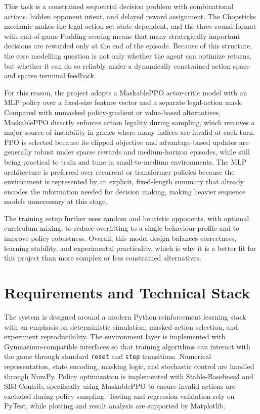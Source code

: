 \documentclass[10pt]{article}
\begin{document}
This task is a constrained sequential decision problem with combinational actions, hidden opponent intent, and delayed reward assignment. The Chopsticks mechanic makes the legal action set state-dependent, and the three-round format with end-of-game Pudding scoring means that many strategically important decisions are rewarded only at the end of the episode. Because of this structure, the core modelling question is not only whether the agent can optimize returns, but whether it can do so reliably under a dynamically constrained action space and sparse terminal feedback.

For this reason, the project adopts a MaskablePPO actor-critic model with an MLP policy over a fixed-size feature vector and a separate legal-action mask. Compared with unmasked policy-gradient or value-based alternatives, MaskablePPO directly enforces action legality during sampling, which removes a major source of instability in games where many indices are invalid at each turn. PPO is selected because its clipped objective and advantage-based updates are generally robust under sparse rewards and medium-horizon episodes, while still being practical to train and tune in small-to-medium environments. The MLP architecture is preferred over recurrent or transformer policies because the environment is represented by an explicit, fixed-length summary that already encodes the information needed for decision making, making heavier sequence models unnecessary at this stage.

The training setup further uses random and heuristic opponents, with optional curriculum mixing, to reduce overfitting to a single behaviour profile and to improve policy robustness. Overall, this model design balances correctness, learning stability, and experimental practicality, which is why it is a better fit for this project than more complex or less constrained alternatives.

\section{Requirements and Technical Stack}

The system is designed around a modern Python reinforcement learning stack with an emphasis on deterministic simulation, masked action selection, and experiment reproducibility. The environment layer is implemented with Gymnasium-compatible interfaces so that training algorithms can interact with the game through standard \texttt{reset} and \texttt{step} transitions. Numerical representation, state encoding, masking logic, and stochastic control are handled through NumPy. Policy optimization is implemented with Stable-Baselines3 and SB3-Contrib, specifically using MaskablePPO to ensure invalid actions are excluded during policy sampling. Testing and regression validation rely on PyTest, while plotting and result analysis are supported by Matplotlib.
\end{document}
